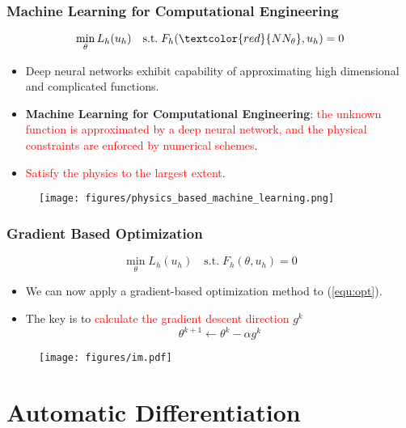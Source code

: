\documentclass[usenames,dvipsnames]{beamer}
\begin{document}
\begin{frame}
	\frametitle{Machine Learning for Computational Engineering}
	$$\min_{\theta} L_h(u_h) \quad \mathrm{s.t.}\;F_h(\textcolor{red}{NN_\theta}, u_h) = 0$$
	\vspace{-0.5cm}
	\begin{itemize}
		\item Deep neural networks exhibit capability of approximating high dimensional and complicated functions. 
		\item \textbf{Machine Learning for Computational Engineering}: \textcolor{red}{the unknown function is approximated by a deep neural network, and the physical constraints are enforced by numerical schemes}.
		\item \textcolor{red}{Satisfy the physics to the largest extent}.
	\end{itemize}
	\begin{figure}[hbt]
  \texttt{[image: figures/physics\_based\_machine\_learning.png]}
\end{figure}
\end{frame}



\begin{frame}
	\frametitle{Gradient Based Optimization}
	\begin{equation}\label{equ:opt}
		\min_{\theta} L_h(u_h) \quad \mathrm{s.t.}\; F_h(\theta, u_h) = 0
		\end{equation}
	
	\begin{itemize}
		\item We can now apply a gradient-based optimization method to (\ref{equ:opt}).
		\item The key is to \textcolor{red}{calculate the gradient descent direction} $g^k$
		$$\theta^{k+1} \gets \theta^k - \alpha g^k$$ 
	\end{itemize}
	
	\begin{figure}[hbt]
	\centering
  \texttt{[image: figures/im.pdf]}
\end{figure}

\end{frame}



\section{Automatic Differentiation}
\end{document}
